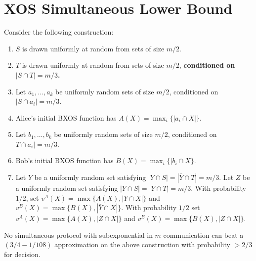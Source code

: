 \section{XOS Simultaneous Lower Bound} 
  Consider the following construction:

  \begin{enumerate} \item $S$ is drawn uniformly at random from sets of size
      $m/2$.  \item $T$ is drawn uniformly at random from sets of size $m/2$,
      \textbf{conditioned on $|S \cap T| = m/3$.} \item Let $a_1,\ldots, a_k$ be
        uniformly random sets of size $m/2$, conditioned on $|S \cap a_i| = m/3$.
      \item Alice's initial BXOS function has $A(X) = \max_i \{|a_i \cap X|\}$.
      \item Let $b_1,\ldots, b_k$ be uniformly random sets of size $m/2$,
        conditioned on $T \cap a_i| = m/3$.  \item Bob's initial BXOS function has
        $B(X) = \max_i \{|b_i \cap X\}$.  \item Let $Y$ be a uniformly random set
          satisfying $|Y \cap S| = |\bar{Y} \cap T| = m/3$. Let $Z$ be a uniformly
          random set satisfying $|Y \cap S| = |Y \cap T| = m/3$. With probability
          $1/2$, set $v^A(X) = \max\{A(X),|Y \cap X|\}$ and $v^B(X) = \max\{B(X),
          |\bar{Y} \cap X|\}$. With probability $1/2$ set $v^A(X) = \max\{A(X), |Z
          \cap X|\}$ and $v^B(X) = \max\{B(X), |Z\cap X|\}$.  \end{enumerate}

  \begin{theorem} No simultaneous protocol with
    subexponential in $m$ communication can beat a $(3/4-1/108)$ approximation on
    the above construction with probability $> 2/3$ for decision.

  \end{theorem}

